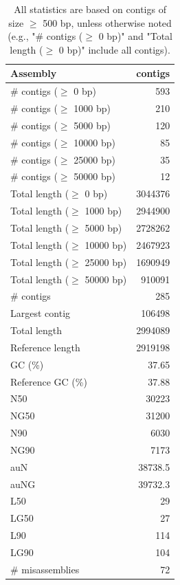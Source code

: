 \documentclass[12pt,a4paper]{article}
\begin{document}
\begin{table}[ht]
\begin{center}
\caption{All statistics are based on contigs of size $\geq$ 500 bp, unless otherwise noted (e.g., "\# contigs ($\geq$ 0 bp)" and "Total length ($\geq$ 0 bp)" include all contigs).}
\begin{tabular}{|l*{1}{|r}|}
\hline
Assembly & contigs \\ \hline
\# contigs ($\geq$ 0 bp) & 593 \\ \hline
\# contigs ($\geq$ 1000 bp) & 210 \\ \hline
\# contigs ($\geq$ 5000 bp) & 120 \\ \hline
\# contigs ($\geq$ 10000 bp) & 85 \\ \hline
\# contigs ($\geq$ 25000 bp) & 35 \\ \hline
\# contigs ($\geq$ 50000 bp) & 12 \\ \hline
Total length ($\geq$ 0 bp) & 3044376 \\ \hline
Total length ($\geq$ 1000 bp) & 2944900 \\ \hline
Total length ($\geq$ 5000 bp) & 2728262 \\ \hline
Total length ($\geq$ 10000 bp) & 2467923 \\ \hline
Total length ($\geq$ 25000 bp) & 1690949 \\ \hline
Total length ($\geq$ 50000 bp) & 910091 \\ \hline
\# contigs & 285 \\ \hline
Largest contig & 106498 \\ \hline
Total length & 2994089 \\ \hline
Reference length & 2919198 \\ \hline
GC (\%) & 37.65 \\ \hline
Reference GC (\%) & 37.88 \\ \hline
N50 & 30223 \\ \hline
NG50 & 31200 \\ \hline
N90 & 6030 \\ \hline
NG90 & 7173 \\ \hline
auN & 38738.5 \\ \hline
auNG & 39732.3 \\ \hline
L50 & 29 \\ \hline
LG50 & 27 \\ \hline
L90 & 114 \\ \hline
LG90 & 104 \\ \hline
\# misassemblies & 72 \\ \hline

\end{tabular}
\end{center}
\end{table}
\end{document}

